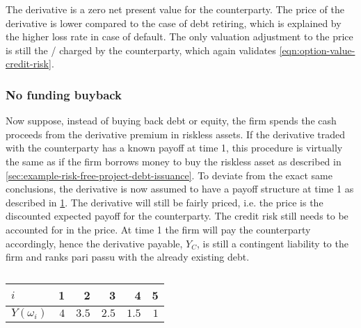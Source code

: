 \documentclass[../main.tex]{subfiles}
\begin{document}
            The derivative is a zero net present value for the counterparty. 
            The price of the derivative is lower compared to the case of debt retiring, 
            which is explained by the higher loss rate in case of default. 
            The only valuation adjustment to the price is still the \CVA/ charged by the counterparty, 
            which again validates \cref{eqn:option-value-credit-risk}.

        \subsubsection{No funding buyback}
            Now suppose, instead of buying back debt or equity, 
            the firm spends the cash proceeds from the derivative premium in riskless assets. 
            If the derivative traded with the counterparty has a known payoff at time 1, this procedure is virtually the same as if the firm borrows money to buy the riskless asset 
            as described in \cref{sec:example-risk-free-project-debt-issuance}. 
            To deviate from the exact same conclusions, the derivative is now assumed to have a payoff structure at time 1 
            as described in \cref{tbl:risky-option-payoff}. 
            The derivative will still be fairly priced, i.e. the price is the discounted expected payoff for the counterparty. 
            The credit risk still needs to be accounted for in the price. 
            At time 1 the firm will pay the counterparty accordingly, hence the derivative payable, $Y_C$, 
            is still a contingent liability to the firm and ranks pari passu with the already existing debt.
            
            \begin{table}[H]
                \centering
                \begin{tabular}{l|rrrrr}
                    $i$ & 1 & 2 & 3 & 4 & 5 \\
                    \hline
                    $Y(\omega_{i})$ & $\num{4}$ & $\num{3.5}$ & $\num{2.5}$ & $\num{1.5}$ & $\num{1}$ \\
                \end{tabular}
                \caption{}
                \label{tbl:risky-option-payoff}
            \end{table}
\end{document}
